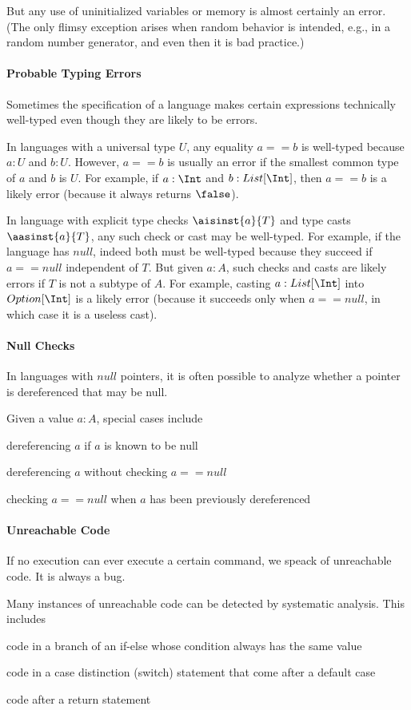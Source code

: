 But any use of uninitialized variables or memory is almost certainly an error.
(The only flimsy exception arises when random behavior is intended, e.g., in a random number generator, and even then it is bad practice.)

\paragraph{Probable Typing Errors}
Sometimes the specification of a language makes certain expressions technically well-typed even though they are likely to be errors.

In languages with a universal type $U$, any equality $a==b$ is well-typed because $a:U$ and $b:U$.
However, $a==b$ is usually an error if the smallest common type of $a$ and $b$ is $U$.
For example, if $a:\Int$ and $b:List[\Int]$, then $a==b$ is a likely error (because it always returns $\false$).

In language with explicit type checks $\aisinst{a}{T}$ and type casts $\aasinst{a}{T}$, any such check or cast may be well-typed.
For example, if the language has $null$, indeed both must be well-typed because they succeed if $a==null$ independent of $T$.
But given $a:A$, such checks and casts are likely errors if $T$ is not a subtype of $A$.
For example, casting $a:List[\Int]$ into $Option[\Int]$ is a likely error (because it succeeds only when $a==null$, in which case it is a useless cast).

\paragraph{Null Checks}
In languages with $null$ pointers, it is often possible to analyze whether a pointer is dereferenced that may be null.

Given a value $a:A$, special cases include
\begin{compactitem}
 \item dereferencing $a$ if $a$ is known to be null
 \item dereferencing $a$ without checking $a==null$
 \item checking $a==null$ when $a$ has been previously dereferenced
\end{compactitem}

\paragraph{Unreachable Code}
If no execution can ever execute a certain command, we speack of unreachable code.
It is always a bug.

Many instances of unreachable code can be detected by systematic analysis.
This includes
\begin{compactitem}
  \item code in a branch of an if-else whose condition always has the same value
  \item code in a case distinction (switch) statement that come after a default case
  \item code after a return statement
\end{compactitem}
